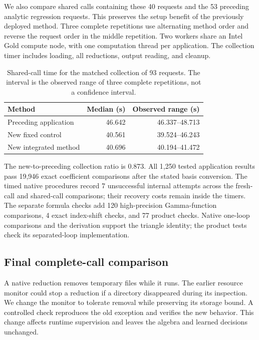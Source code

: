 We also compare shared calls containing these 40 requests and the 53 preceding analytic regression requests. This preserves the setup benefit of the previously deployed method. Three complete repetitions use alternating method order and reverse the request order in the middle repetition. Two workers share an Intel Gold compute node, with one computation thread per application. The collection timer includes loading, all reductions, output reading, and cleanup.
\begin{table}[htbp]\centering\small
\caption{Shared-call time for the matched collection of 93 requests. The interval is the observed range of three complete repetitions, not a confidence interval.}
\label{notes-triangle:tab:triangle-batch}
\begin{tabular}{lrr}\toprule
Method & Median (s) & Observed range (s)\\\midrule
Preceding application & 46.642 & 46.337--48.713 \\
New fixed control & 40.561 & 39.524--46.243 \\
New integrated method & 40.696 & 40.194--41.472 \\
\bottomrule\end{tabular}\end{table}

The new-to-preceding collection ratio is 0.873. All 1,250 tested application results pass 19,946 exact coefficient comparisons after the stated basis conversion. The timed native procedures record 7 unsuccessful internal attempts across the fresh-call and shared-call comparisons; their recovery costs remain inside the timers. The separate formula checks add 120 high-precision Gamma-function comparisons, 4 exact index-shift checks, and 77 product checks. Native one-loop comparisons and the derivation support the triangle identity; the product tests check its separated-loop implementation.

\subsection{Final complete-call comparison}
A native reduction removes temporary files while it runs. The earlier resource monitor could stop a reduction if a directory disappeared during its inspection. We change the monitor to tolerate removal while preserving its storage bound. A controlled check reproduces the old exception and verifies the new behavior. This change affects runtime supervision and leaves the algebra and learned decisions unchanged.

